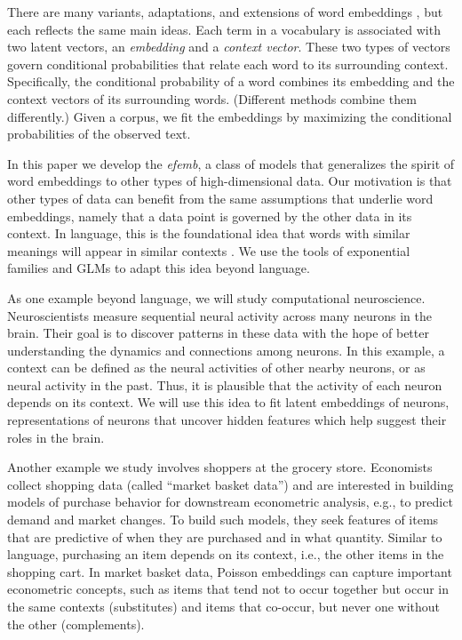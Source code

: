 \documentclass[12pt]{article}
\begin{document}
There are many variants, adaptations, and extensions of word
embeddings
\citep{mikolov2013efficient,mikolov2013distributed,mnih2013learning,levy2014neural,pennington2014glove,vilnis2014word},
but each reflects the same main ideas.  Each term in a vocabulary is
associated with two latent vectors, an \textit{embedding} and a
\textit{context vector}.  These two types of vectors govern
conditional probabilities that relate each word to its surrounding context.
Specifically, the conditional
probability of a word combines its embedding and the context vectors
of its surrounding words.  (Different methods combine them
differently.)  Given a corpus, we fit the embeddings %
by maximizing the conditional probabilities of the observed
text.

In this paper we develop the \textit{\gls{efemb}}, a class of models
that generalizes the spirit of word embeddings to other types of
high-dimensional data. Our motivation is that other types of data can
benefit from the same assumptions that underlie word embeddings,
namely that a data point is governed by the other data in its
context. In language, this is the foundational idea that words with
similar meanings will appear in similar contexts
\citep{harris1954distributional}. We use the tools of exponential
families \citep{brown1986fundamentals} and \glspl{GLM}
\citep{mccullagh1989generalized} to adapt this idea beyond language.

As one example beyond language, we will study
computational neuroscience. Neuroscientists measure sequential neural
activity across many neurons in the brain. Their goal is to discover
patterns in these data with the hope of better understanding the
dynamics and connections among neurons.  In this example, a context
can be defined as the neural activities of other nearby neurons, or as
neural activity in the past.  Thus, it is plausible that the activity
of each neuron depends on its context.  We will use this idea to fit
latent embeddings of neurons, representations of neurons that uncover
hidden features which help suggest their roles in the brain.

Another example we study involves shoppers at the grocery store.
Economists collect shopping data (called ``market basket data'') and
are interested in building models of purchase behavior for downstream
econometric analysis, e.g., to predict demand and market changes. To
build such models, they seek features of items that are predictive of
when they are purchased and in what quantity. Similar to language,
purchasing an item depends on its context, i.e., the other items in
the shopping cart. In market basket data, Poisson embeddings can
capture important econometric concepts, such as items that tend not to
occur together but occur in the same contexts (substitutes) and items
that co-occur, but never one without the other (complements).
\end{document}

